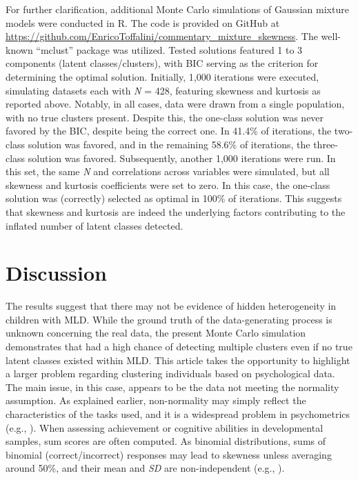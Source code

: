 \documentclass[letterpaper,11pt]{article}
\begin{document}
For further clarification, additional Monte Carlo simulations of Gaussian mixture models were conducted in R. The code is provided on GitHub at \url{https://github.com/EnricoToffalini/commentary_mixture_skewness}. The well-known “mclust” package \cite{scrucca2016mclust} was utilized. Tested solutions featured 1 to 3 components (latent classes/clusters), with BIC serving as the criterion for determining the optimal solution. Initially, 1,000 iterations were executed, simulating datasets each with \textit{N} = 428, featuring skewness and kurtosis as reported above. Notably, in all cases, data were drawn from a single population, with no true clusters present. Despite this, the one-class solution was never favored by the BIC, despite being the correct one. In 41.4\% of iterations, the two-class solution was favored, and in the remaining 58.6\% of iterations, the three-class solution was favored. Subsequently, another 1,000 iterations were run. In this set, the same \textit{N} and correlations across variables were simulated, but all skewness and kurtosis coefficients were set to zero. In this case, the one-class solution was (correctly) selected as optimal in 100\% of iterations. This suggests that skewness and kurtosis are indeed the underlying factors contributing to the inflated number of latent classes detected.

\section*{Discussion}

The results suggest that there may not be evidence of hidden heterogeneity in children with MLD. While the ground truth of the data-generating process is unknown concerning the real data, the present Monte Carlo simulation demonstrates that  had a high chance of detecting multiple clusters even if no true latent classes existed within MLD. This article takes the opportunity to highlight a larger problem regarding clustering individuals based on psychological data. The main issue, in this case, appears to be the data not meeting the normality assumption. As explained earlier, non-normality may simply reflect the characteristics of the tasks used, and it is a widespread problem in psychometrics (e.g., ). When assessing achievement or cognitive abilities in developmental samples, sum scores are often computed. As binomial distributions, sums of binomial (correct/incorrect) responses may lead to skewness unless averaging around 50\%, and their mean and \textit{SD} are non-independent (e.g., ).
\end{document}
